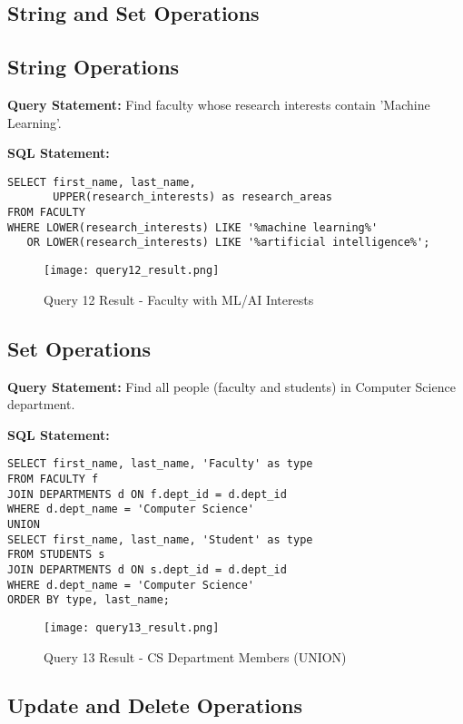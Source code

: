 \documentclass[12pt,a4paper]{article}
\begin{document}
\subsection{String and Set Operations}

\subsection{String Operations}
\textbf{Query Statement:} Find faculty whose research interests contain 'Machine Learning'.

\textbf{SQL Statement:}
\begin{lstlisting}[style=sqlstyle]
SELECT first_name, last_name, 
       UPPER(research_interests) as research_areas
FROM FACULTY
WHERE LOWER(research_interests) LIKE '%machine learning%'
   OR LOWER(research_interests) LIKE '%artificial intelligence%';
\end{lstlisting}

\begin{figure}[H]
    \centering
    \texttt{[image: query12\_result.png]}
    \caption{Query 12 Result - Faculty with ML/AI Interests}
\end{figure}

\subsection{Set Operations}
\textbf{Query Statement:} Find all people (faculty and students) in Computer Science department.

\textbf{SQL Statement:}
\begin{lstlisting}[style=sqlstyle]
SELECT first_name, last_name, 'Faculty' as type
FROM FACULTY f
JOIN DEPARTMENTS d ON f.dept_id = d.dept_id
WHERE d.dept_name = 'Computer Science'
UNION
SELECT first_name, last_name, 'Student' as type
FROM STUDENTS s
JOIN DEPARTMENTS d ON s.dept_id = d.dept_id
WHERE d.dept_name = 'Computer Science'
ORDER BY type, last_name;
\end{lstlisting}

\begin{figure}[H]
    \centering
    \texttt{[image: query13\_result.png]}
    \caption{Query 13 Result - CS Department Members (UNION)}
\end{figure}

\subsection{Update and Delete Operations}
\end{document}
